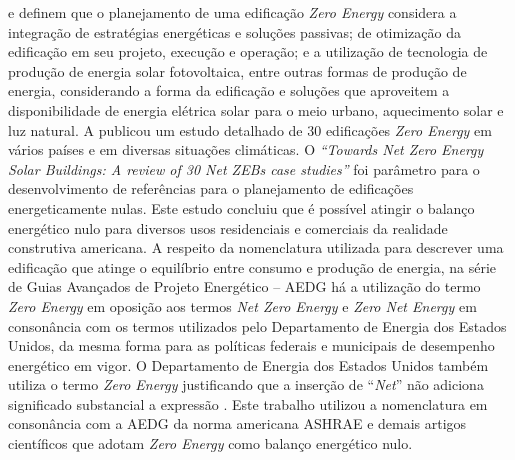 \textcite{Didone2014} e \textcite{Athienitis2015} definem que o planejamento de uma edificação \textit{Zero Energy} considera a integração de estratégias energéticas e soluções passivas; de otimização da edificação em seu projeto, execução e operação; e a utilização de tecnologia de produção de energia solar fotovoltaica, entre outras formas de produção de energia, considerando a forma da edificação e soluções que aproveitem a disponibilidade de energia elétrica solar para o meio urbano, aquecimento solar e luz natural.\vspace*{0.3cm} \newline
A \textcite{InternationalEnergyAgency-IEA2014} publicou um estudo detalhado de 30 edificações \textit{Zero Energy} em vários países e em diversas situações climáticas. O \textit{“Towards Net Zero Energy Solar Buildings: A review of 30 Net ZEBs case studies”} foi parâmetro para o desenvolvimento de referências para o planejamento de edificações energeticamente nulas. Este estudo concluiu que é possível atingir o balanço energético nulo para diversos usos residenciais e comerciais da realidade construtiva americana.\vspace*{0.3cm} \newline
A respeito da nomenclatura utilizada para descrever uma edificação que atinge o equilíbrio entre consumo e produção de energia, na série de Guias Avançados de Projeto Energético – AEDG \cite{AmericanSocietyofHeatingRefrigeratingandAir-ConditioningEngineers-ASHRAE2019} há a utilização do termo \textit{Zero Energy} em oposição aos termos \textit{Net Zero Energy} e \textit{Zero Net Energy} em consonância com os termos utilizados pelo Departamento de Energia dos Estados Unidos, da mesma forma para as políticas federais e municipais de desempenho energético em vigor. O Departamento de Energia dos Estados Unidos também utiliza o termo \textit{Zero Energy} justificando que a inserção de “\textit{Net}” não adiciona significado substancial a expressão \cite{U.S.DepartmentofEnergy-USDOE2015a}. Este trabalho utilizou a nomenclatura em consonância com a AEDG da norma americana ASHRAE e demais artigos científicos que adotam \textit{Zero Energy} como balanço energético nulo.

